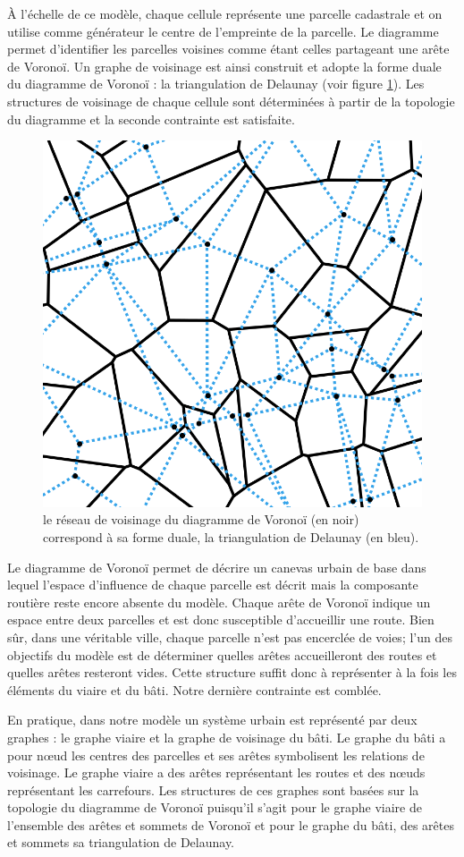 \documentclass[12pt]{article}
\begin{document}
À l'échelle de ce modèle, chaque cellule représente une parcelle
cadastrale et on utilise comme générateur le centre de l'empreinte de
la parcelle. Le diagramme permet d'identifier les parcelles voisines
comme étant celles partageant une arête de Voronoï. Un graphe de
voisinage est ainsi construit et adopte la forme duale du diagramme de
Voronoï : la triangulation de Delaunay (voir figure
\ref{fig:delaunay}). Les structures de voisinage de chaque cellule
sont déterminées à partir de la topologie du diagramme et la seconde
contrainte est satisfaite.

\begin{figure}[!ht]
  \centering
  \includegraphics[width=.7\linewidth]{images/delaunay.png}
  \caption{le réseau de voisinage du diagramme de Voronoï (en noir)
    correspond à sa forme duale, la triangulation de Delaunay (en
    bleu).}
  \label{fig:delaunay}
\end{figure}

Le diagramme de Voronoï permet de décrire un canevas urbain de base
dans lequel l'espace d'influence de chaque parcelle est décrit mais la
composante routière reste encore absente du modèle. Chaque arête de
Voronoï indique un espace entre deux parcelles et est donc susceptible
d'accueillir une route. Bien sûr, dans une véritable ville, chaque
parcelle n'est pas encerclée de voies; l'un des objectifs du modèle
est de déterminer quelles arêtes accueilleront des routes et quelles
arêtes resteront vides. Cette structure suffit donc à représenter à la
fois les éléments du viaire et du bâti. Notre dernière contrainte est
comblée.

En pratique, dans notre modèle un système urbain est représenté par
deux graphes : le graphe viaire et la graphe de voisinage du bâti. Le
graphe du bâti a pour n\oe ud les centres des parcelles et ses arêtes
symbolisent les relations de voisinage. Le graphe viaire a des arêtes
représentant les routes et des n\oe uds représentant les
carrefours. Les structures de ces graphes sont basées sur la topologie
du diagramme de Voronoï puisqu'il s'agit pour le graphe viaire de
l'ensemble des arêtes et sommets de Voronoï et pour le graphe du bâti,
des arêtes et sommets sa triangulation de Delaunay.
\end{document}
